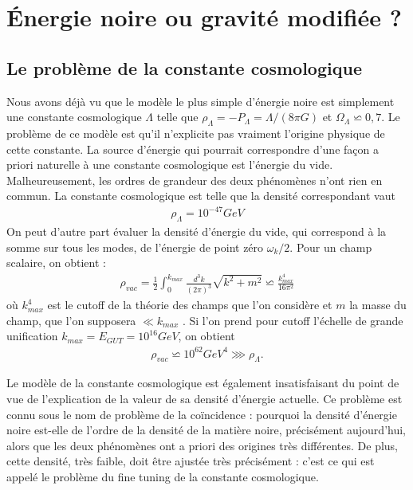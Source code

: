 \documentclass[a4paper,12pt]{report}
\theoremstyle{plain}
\theoremstyle{plain}
\begin{document}
\newpage
 
 \section{\'Energie noire ou gravit\'e modifi\'ee ?} \label{emilo}
\subsection{Le probl\`eme de la constante cosmologique}
Nous avons d\'ej\`a vu que le mod\`ele le plus simple d'\'energie noire est simplement une
constante cosmologique $ \Lambda $ telle que $ \rho_\Lambda = -P_\Lambda =  \Lambda /(8 \pi G)$ et $ \Omega_\Lambda \backsimeq 0,7 $. Le probl\`eme
de ce mod\`ele est qu'il n'explicite pas vraiment l'origine physique de cette constante. La
source d'\'energie qui pourrait correspondre d'une fa\c{c}on a priori naturelle \`a une constante
cosmologique est l'\'energie du vide. Malheureusement, les ordres de grandeur des deux
ph\'enom\`enes n'ont rien en commun. La constante cosmologique est telle que la densit\'e correspondant vaut
\begin{eqnarray}
 \rho_\Lambda = 10^{-47}GeV   \label{gene36}
\end{eqnarray}
On peut d'autre part \'evaluer la densit\'e d'\'energie du vide, qui correspond \`a la somme sur
tous les modes, de l'\'energie de point z\'ero  $ \omega_k/2 $. Pour un champ scalaire, on obtient :
\begin{eqnarray}
 \rho_{vac} = \frac{1}{2} \int_0^{k_{max} } \frac{d^3k}{(2 \pi)^3} \sqrt{k^2 + m^2} \backsimeq  \frac{k^4_{max}}{ 16 \pi^2} \label{gene37}
\end{eqnarray}
o\`u $ k^4_{max} $ est le  cutoff
de la th\'eorie des champs que l'on consid\`ere et $m$ la masse du champ,
que l'on supposera  $ \ll k_{max} $ . Si l'on prend pour cutoff l'\'echelle de grande unification $ k_{max} =
E_{GUT} = 10^{16} GeV $, on obtient
\begin{eqnarray}
 \rho_{vac} \backsimeq 10^{62 } GeV^4 \ggg  \rho_\Lambda.  \label{gene38}
\end{eqnarray}

Le mod\`ele de la constante cosmologique est \'egalement insatisfaisant du point de vue de
l'explication de la valeur de sa densit\'e d'\'energie actuelle. Ce probl\`eme est connu sous le
nom de probl\`eme de la co\"{i}ncidence : pourquoi la densit\'e d'\'energie noire est-elle de l'ordre
de la densit\'e de la mati\`ere noire, pr\'ecis\'ement aujourd'hui, alors que les deux ph\'enom\`enes
ont a priori des origines tr\`es diff\'erentes. De plus, cette densit\'e, tr\`es faible, doit \^etre 
ajust\'ee tr\`es pr\'ecis\'ement : c'est ce qui est appel\'e le probl\`eme du fine tuning de la constante
cosmologique.
\end{document}
